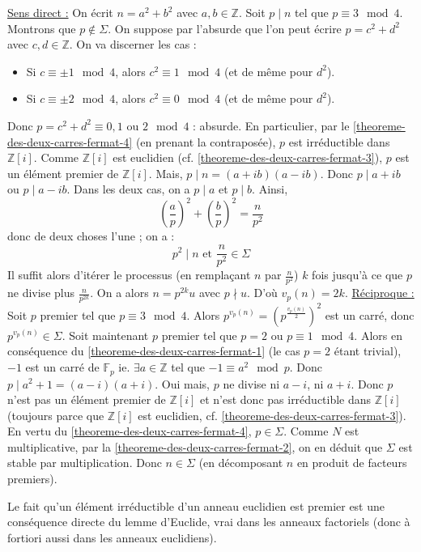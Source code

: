 	\begin{demonstration}
		\uline{Sens direct :} On écrit $n = a^2 + b^2$ avec $a, b \in \mathbb{Z}$. Soit $p \mid n$ tel que $p \equiv 3 \mod 4$. Montrons que $p \notin \Sigma$. On suppose par l'absurde que l'on peut écrire $p = c^2 + d^2$ avec $c, d \in \mathbb{Z}$. On va discerner les cas :
		\begin{itemize}
			\item Si $c \equiv \pm 1 \mod 4$, alors $c^2 \equiv 1 \mod 4$ (et de même pour $d^2$).
			\item Si $c \equiv \pm 2 \mod 4$, alors $c^2 \equiv 0 \mod 4$ (et de même pour $d^2$).
		\end{itemize}
		Donc $p = c^2 + d^2 \equiv 0, 1 \text{ ou } 2 \mod 4$ : absurde. En particulier, par le \cref{theoreme-des-deux-carres-fermat-4} (en prenant la contraposée), $p$ est irréductible dans $\mathbb{Z}[i]$. Comme $\mathbb{Z}[i]$ est euclidien (cf. \cref{theoreme-des-deux-carres-fermat-3}), $p$ est un élément premier de $\mathbb{Z}[i]$. Mais, $p \mid n = (a+ib)(a-ib)$. Donc $p \mid a+ib$ ou $p \mid a-ib$.
		Dans les deux cas, on a $p \mid a$ et $p \mid b$. Ainsi,
		\[ \left( \frac{a}{p} \right)^2 + \left( \frac{b}{p} \right)^2 = \frac{n}{p^2} \]
		donc de deux choses l'une ; on a :
		\[ p^2 \mid n \text{ et } \frac{n}{p^2} \in \Sigma \]
		Il suffit alors d'itérer le processus (en remplaçant $n$ par $\frac{n}{p^2}$) $k$ fois jusqu'à ce que $p$ ne divise plus $\frac{n}{p^{2k}}$. On a alors $n = p^{2k} u$ avec $p \nmid u$. D'où $v_p(n) = 2k$.
		\newpar
		\uline{Réciproque :} Soit $p$ premier tel que $p \equiv 3 \mod 4$. Alors $p^{v_p(n)} = \left( p^{\frac{v_p(n)}{2}} \right)^2$ est un carré, donc $p^{v_p(n)} \in \Sigma$.
		\newpar
		Soit maintenant $p$ premier tel que $p = 2$ ou $p \equiv 1  \mod 4$. Alors en conséquence du \cref{theoreme-des-deux-carres-fermat-1} (le cas $p = 2$ étant trivial), $-1$ est un carré de $\mathbb{F}_p$ ie. $\exists a \in \mathbb{Z}$ tel que $-1 \equiv a^2 \mod p$. Donc $p \mid a^2 + 1 = (a-i)(a+i)$. Oui mais, $p$ ne divise ni $a-i$, ni $a+i$. Donc $p$ n'est pas un élément premier de $\mathbb{Z}[i]$ et n'est donc pas irréductible dans $\mathbb{Z}[i]$ (toujours parce que $\mathbb{Z}[i]$ est euclidien, cf. \cref{theoreme-des-deux-carres-fermat-3}). En vertu du \cref{theoreme-des-deux-carres-fermat-4}, $p \in \Sigma$.
		\newpar
		Comme $N$ est multiplicative, par la \cref{theoreme-des-deux-carres-fermat-2}, on en déduit que $\Sigma$ est stable par multiplication. Donc $n \in \Sigma$ (en décomposant $n$ en produit de facteurs premiers).
	\end{demonstration}


	\begin{remark}
		Le fait qu'un élément irréductible d'un anneau euclidien est premier est une conséquence directe du lemme d'Euclide, vrai dans les anneaux factoriels (donc à fortiori aussi dans les anneaux euclidiens).
	\end{remark}

